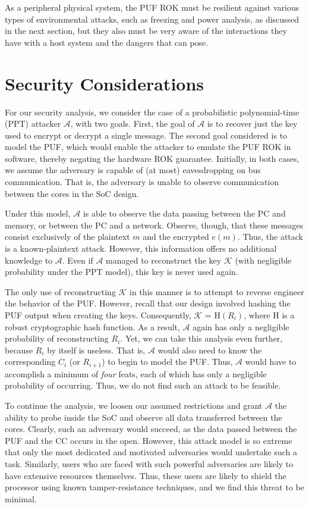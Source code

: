 As a peripheral physical system, the PUF ROK must be resilient against various types of environmental attacks, such
as freezing and power analysis, as discussed in the next section, but they also must be very aware of the
interactions they have with a host system and the dangers that can pose.

\section{Security Considerations}
For our security analysis, we consider the case of a probabilistic polynomial-time (PPT) attacker $\mathcal{A}$,
with two goals.  First, the goal of $\mathcal{A}$ is to recover just the key used to encrypt or decrypt a
single message.  The second goal considered is to model the PUF, which would enable the attacker to emulate
the PUF ROK in software, thereby negating the hardware ROK guarantee.  Initially, in both cases, we assume
the adversary is capable of (at most) eavesdropping on bus communication.  That is, the adversary is unable
to observe communication between the cores in the SoC design.

Under this model, $\mathcal{A}$ is able to observe the data passing between the PC and memory, or between
the PC and a network.  Observe, though, that these messages consist exclusively of the plaintext $m$ and the
encrypted $e(m)$.  Thus, the attack is a known-plaintext attack.  However, this information offers no
additional knowledge to $\mathcal{A}$.  Even if $\mathcal{A}$ managed to reconstruct the key $\mathcal{K}$
(with negligible probability under the PPT model), this key is never used again.

The only use of reconstructing $\mathcal{K}$ in this manner is to attempt to reverse engineer
the behavior of the PUF.  However, recall that our design involved hashing the PUF output when
creating the keys.  Consequently, $\mathcal{K}$ = {\sf H}$(R_i)$, where {\sf H} is a robust cryptographic
hash function.  As a result, $\mathcal{A}$ again has only a negligible probability of reconstructing $R_i$.
Yet, we can take this analysis even further, because $R_i$ by itself is useless.  That is, $\mathcal{A}$
would also need to know the corresponding $C_i$ (or $R_{i+1}$) to begin to model the PUF.  Thus, $\mathcal{A}$
would have to accomplish a minimum of \emph{four} feats, each of which has only a negligible probability of
occurring.  Thus, we do not find such an attack to be feasible.

To continue the analysis, we loosen our assumed restrictions and grant $\mathcal{A}$ the ability to probe
inside the SoC and observe all data transferred between the cores.  Clearly, such an adversary would
succeed, as the data passed between the PUF and the CC occurs in the open.  However, this attack model
is so extreme that only the most dedicated and motivated adversaries would undertake such a task.
Similarly, users who are faced with such powerful adversaries are likely to have extensive resources 
themselves.  Thus, these users are likely to shield the processor using known tamper-resistance
techniques, and we find this threat to be minimal.

